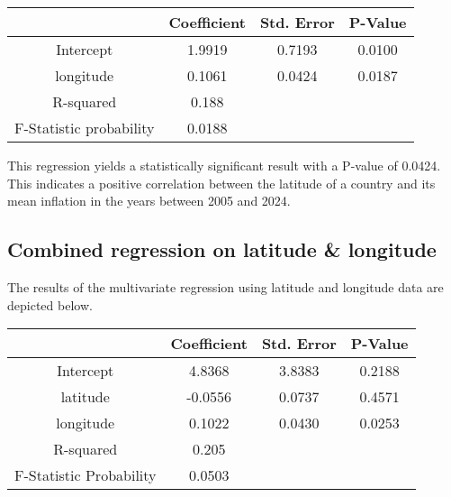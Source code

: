 \documentclass{article}
\begin{document}
    \begin{center}
    \begin{tabular}{cccc}
        \toprule
        {} &  Coefficient &  Std. Error &   P-Value \\
        \midrule
        Intercept &     1.9919 &    0.7193 &  0.0100 \\
        longitude &     0.1061 &    0.0424 &  0.0187 \\
        \hline
        R-squared     &     0.188\\
        F-Statistic probability &   0.0188\\
        \bottomrule
        \end{tabular}
    \end{center}
    \vspace{\baselineskip}

    This regression yields a statistically significant result with a P-value of 0.0424. This indicates a positive correlation between the latitude of a country and its mean inflation in the years between 2005 and 2024.

    \subsection{Combined regression on latitude \& longitude}

    The results of the multivariate regression using latitude and longitude data are depicted below.

    \vspace{\baselineskip}

    \begin{center}
    \begin{tabular}{cccc}
        \toprule
        {} &  Coefficient &  Std. Error &   P-Value \\
        \midrule
        Intercept &     4.8368 &    3.8383 &  0.2188 \\
        latitude  &    -0.0556 &    0.0737 &  0.4571 \\
        longitude &     0.1022 &    0.0430 &  0.0253 \\
        \hline
        R-squared     &    0.205\\
        F-Statistic Probability &   0.0503\\
        \bottomrule
        \end{tabular}
    \end{center}
    \vspace{\baselineskip}
    
\end{document}
